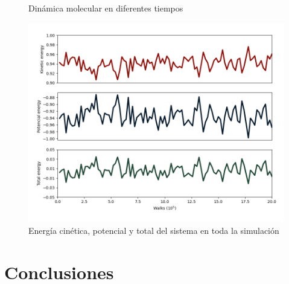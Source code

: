 \documentclass[12pt,letterpaper]{article}
\begin{document}
\begin{multicols}{2}
\begin{figure}[H]
    \caption{Dinámica molecular en diferentes tiempos}
    \label{screen dinámica}
\end{figure}
\begin{figure}[H]
    \hspace{-0.5cm}
    \includegraphics[scale=0.35]{../Graphics/Energy.png}
    \caption{Energía cinética, potencial y total del sistema en toda la simulación}
    \label{energias}
\end{figure}
\section*{Conclusiones}

\end{multicols}
\end{document}
